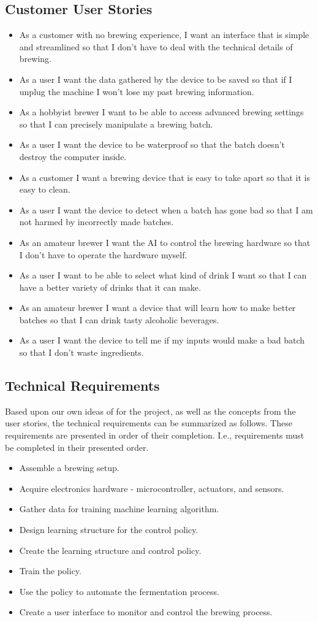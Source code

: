 \documentclass[draftclsnofoot,onecolumn,letterpaper,10pt]{article}
\begin{document}
\subsection{Customer User Stories}
\begin{itemize}
	\item As a customer with no brewing experience, I want an interface that is simple and streamlined so that I don't have to deal with the technical details of brewing.
	\item As a user I want the data gathered by the device to be saved so that if I unplug the machine I won't lose my past brewing information.
	\item As a hobbyist brewer I want to be able to access advanced brewing settings so that I can precisely manipulate a brewing batch.
	\item As a user I want the device to be waterproof so that the batch doesn't destroy the computer inside.
	\item As a customer I want a brewing device that is easy to take apart so that it is easy to clean.
	\item As a user I want the device to detect when a batch has gone bad so that I am not harmed by incorrectly made batches.
	\item As an amateur brewer I want the AI to control the brewing hardware so that I don't have to operate the hardware myself.
	\item As a user I want to be able to select what kind of drink I want so that I can have a better variety of drinks that it can make.
	\item As an amateur brewer I want a device that will learn how to make better batches so that I can drink tasty alcoholic beverages.
	\item As a user I want the device to tell me if my inputs would make a bad batch so that I don't waste ingredients.
\end{itemize}
\subsection{Technical Requirements}
Based upon our own ideas of for the project, as well as the concepts from the user stories, the technical requirements can be summarized as follows.
These requirements are presented in order of their completion.
I.e., requirements must be completed in their presented order.
\begin{itemize}
	\item Assemble a brewing setup.
	\item Acquire electronics hardware - microcontroller, actuators, and sensors.
	\item Gather data for training machine learning algorithm.
	\item Design learning structure for the control policy.
	\item Create the learning structure and control policy.
	\item Train the policy.
	\item Use the policy to automate the fermentation process.
	\item Create a user interface to monitor and control the brewing process.
\end{itemize}
\end{document}

